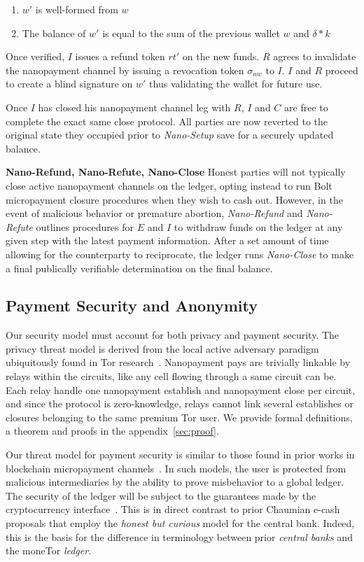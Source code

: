 \begin{enumerate}
\item $w'$ is well-formed from $w$
\item The balance of $w'$ is equal to the sum of the previous wallet $w$ and
  $\delta * k$
\end{enumerate}

Once verified, $I$ issues a refund token $rt'$ on the new funds. $R$ agrees to
invalidate the nanopayment channel by issuing a revocation token $\sigma_{nw}$
to $I$. $I$ and $R$ proceed to create a blind signature on $w'$ thus validating
the wallet for future use.

Once $I$ has closed his nanopayment channel leg with $R$, $I$ and $C$ are free
to complete the exact same close protocol. All parties are now reverted to the
original state they occupied prior to \emph{Nano-Setup} save for a securely updated
balance.

\textbf{Nano-Refund, Nano-Refute, Nano-Close} Honest parties will not typically
close active nanopayment channels on the ledger, opting instead to run Bolt
micropayment closure procedures when they wish to cash out. However, in the
event of malicious behavior or premature abortion, \emph{Nano-Refund} and
\emph{Nano-Refute} outlines procedures for $E$ and $I$ to withdraw funds on the
ledger at any given step with the latest payment information. After a set amount
of time allowing for the counterparty to reciprocate, the ledger runs
\emph{Nano-Close} to make a final publically verifiable determination on the
final balance.

\subsection{Payment Security and Anonymity}
Our security model must account for both privacy and payment security. The
privacy threat model is derived from the local active adversary paradigm
ubiquitously found in Tor research~\cite{dingledine2004tor}. Nanopayment pays are trivially linkable by relays within the circuits, like any cell flowing through a same circuit can be. Each relay handle one nanopayment establish and nanopayment close per circuit, and since the protocol is zero-knowledge, relays cannot link several establishes or closures belonging to the same premium Tor user. We provide formal definitions, a theorem and proofs in the appendix~\ref{sec:proof}.

Our threat model for payment security is similar to those found in prior works
in blockchain micropayment channels~\cite{poon2016bitcoin}. In such models, the
user is protected from malicious intermediaries by the ability to prove
misbehavior to a global ledger. The security of the ledger will be subject to
the guarantees made by the cryptocurrency interface~\cite{back2014enabling,
  poon2017plasma}. This is in direct contrast to prior Chaumian e-cash proposals
that employ the \emph{honest but curious} model for the central bank. Indeed,
this is the basis for the difference in terminology between prior \emph{central
  banks} and the moneTor \emph{ledger}.

